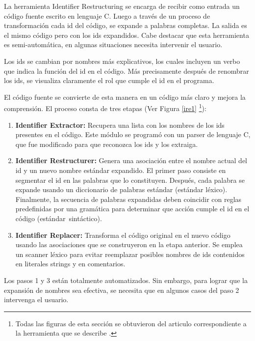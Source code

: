 La herramienta Identifier Restructuring \cite{BCPT00} se encarga de recibir como entrada un código fuente escrito en lenguaje C. Luego a través de un proceso de transformación cada id del código, se expande a palabras completas. La salida es el mismo código pero con los ids expandidos.
Cabe destacar que esta herramienta es semi-automática, en algunas situaciones necesita intervenir el usuario.

Los ids se cambian por nombres más explicativos, los cuales incluyen un verbo que indica la función del id en el código. Más precisamente después de renombrar los ids, se visualiza claramente el rol que cumple el id en el programa.

El código fuente se convierte de esta manera en un código más claro y mejora la comprensión. El proceso consta de tres etapas (Ver Figura \ref{ire1} \footnote[1]{Todas las figuras de esta sección se obtuvieron del articulo correspondiente a la herramienta que se describe \cite{BCPT00}.}): 

\begin{enumerate}
\itemsep0em%
\item \textbf{Identifier Extractor:} Recupera una lista con los nombres de los ids presentes en el código. Este módulo se programó con un parser de lenguaje C, que fue modificado para que reconozca los ids y los extraiga.
\item \textbf{Identifier Restructurer:} Genera una asociación entre el nombre actual del id y un nuevo nombre estándar expandido. El primer paso consiste en segmentar el id en las palabras que lo constituyen. Después, cada palabra se expande usando un diccionario de palabras estándar (estándar léxico). Finalmente, la secuencia de palabras expandidas deben coincidir con reglas predefinidas por una gramática para determinar que acción cumple el id en el código \mbox{(estándar sintáctico).}
\item \textbf{Identifier Replacer:} Transforma el código original en el nuevo código usando las asociaciones que se construyeron en la etapa anterior. Se emplea un scanner léxico para evitar reemplazar posibles nombres de ids contenidos en literales strings y en comentarios.
\end{enumerate}

Los pasos 1 y 3 están totalmente automatizados. Sin embargo, para lograr que la expansión de nombres sea efectiva, se necesita que en algunos casos del paso 2 intervenga el usuario.

